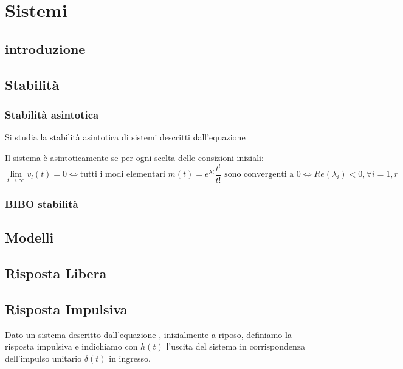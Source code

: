 \chapter{Sistemi}
\section{introduzione}



\section{Stabilità}
\subsection{Stabilità asintotica}
Si studia la stabilità asintotica di sistemi descritti dall'equazione %

\begin{theorem}
	Il sistema %
	è asintoticamente se per ogni scelta delle consizioni iniziali:
	\begin{equation*}
		\lim_{t \to \infty}v_l(t)=0
		\Leftrightarrow\text{tutti i modi elementari } m(t)=e^{\lambda t}\frac{t^l}{t!}\text{ sono convergenti a $0$}
		\Leftrightarrow Re(\lambda_i)<0,\forall i = \overline{1,r}
	\end{equation*}
\end{theorem}


\subsection{BIBO stabilità}

\section{Modelli}

\section{Risposta Libera}

\section{Risposta Impulsiva}
\begin{definition}
	Dato un sistema descritto dall'equazione %
	, inizialmente a riposo, definiamo la risposta impulsiva e indichiamo con $h(t)$ l'uscita del sistema in corrispondenza dell'impulso unitario $\delta (t)$ in ingresso.
\end{definition}

